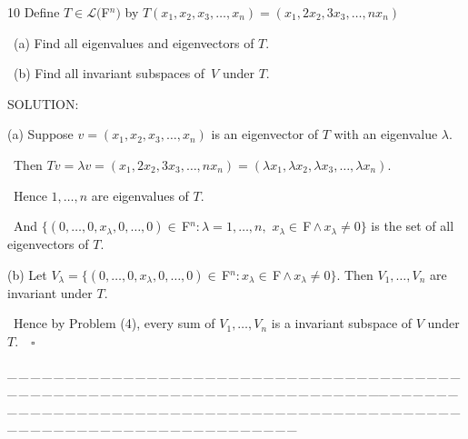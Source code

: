 \documentclass[a4paper, 11pt, UTF8]{article}
\def\Lm{\mathcal{L}}
\def\Fbf{$\,{\timesbf F}\,$}
\def\Fbfc{$\,{\timesbf F}$}
\begin{document}
\begin{large}
{\timesbf\Large 10} {\timessl\Large 
Define $T\in\Lm(${\timesbf F}$^n)$ by $T(x_1,x_2,x_3,\dots,x_n)=(x_1,2 x_2,3 x_3,\dots,n x_n)$
}\par\quad\,
(a) {\timessl\Large Find all eigenvalues and eigenvectors of $T.$}\par\quad\,
(b) {\timessl\Large Find all invariant subspaces of \,$V$ under $T.$}\par
{\timesbf S\footnotesize{OLUTION:}}\par\quad
(a) Suppose $v=(x_1,x_2,x_3,\dots,x_n)$ is an eigenvector of $T$ with an eigenvalue $\lambda.$\par\qquad\,
Then $Tv=\lambda v=(x_1,2 x_2,3 x_3,\dots,n x_n)=(\lambda x_1,\lambda x_2,\lambda x_3,\dots,\lambda x_n).$\par\qquad\,
Hence $1,\dots,n$ are eigenvalues of $T.$\par\qquad\,
And $\{(0,\dots,0,x_\lambda,0,\dots,0)\in\Fbfc^n:\lambda=1,\dots,n,\,\,x_\lambda\in\Fbf\wedge\,x_\lambda\neq 0\}$ is the set of all eigenvectors of $T.$\par\quad
(b) Let $V_\lambda=\{(0,\dots,0,x_\lambda,0,\dots,0)\in\Fbfc^n:x_\lambda\in\Fbf\wedge\,x_\lambda\neq 0\}.$ Then $V_1,\dots,V_n$ are invariant under $T.$\par\qquad\,
Hence by Problem (4), every sum of $V_1,\dots,V_n$ is a invariant subspace of $V$ under $T.\quad\square$\par
{\tiny \_\,\_\,\_\,\_\,\_\,\_\,\_\,\_\,\_\,\_\,\_\,\_\,\_\,\_\,\_\,\_\,\_\,\_\,\_\,\_\,\_\,\_\,\_\,\_\,\_\,\_\,\_\,\_\,\_\,\_\,\_\,\_\,\_\,\_\,\_\,\_\,\_\,\_\,\_\,\_\,\_\,\_\,\_\,\_\,\_\,\_\,\_\,\_\,\_\,\_\,\_\,\_\,\_\,\_\,\_\,\_\,\_\,\_\,\_\,\_\,\_\,\_\,\_\,\_\,\_\,\_\,\_\,\_\,\_\,\_\,\_\_\,\_\,\_\,\_\,\_\,\_\,\_\,\_\,\_\,\_\,\_\,\_\,\_\,\_\,\_\,\_\,\_\,\_\,\_\,\_\,\_\,\_\,\_\,\_\,\_\,\_\,\_\,\_\,\_\,\_\,\_\,\_\,\_\,\_\,\_\,\_\,\_\,\_\,\_\,\_\,\_\,\_\,\_\,\_\,\_\,\_\,\_\,\_\,\_\,\_\,\_\,\_\,\_\,\_\,\_\,\_\,\_\,\_\,\_\,\_\,\_\,\_\,\_\,\_\,\_\,\_\,\_\,\_\,\_\,\_\,\_}\par


\end{large}
\end{document}
